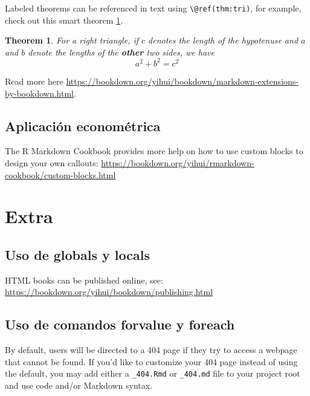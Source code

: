 \documentclass[
]{book}
\newtheorem{theorem}{Theorem}[chapter]
\theoremstyle{definition}
\theoremstyle{definition}
\theoremstyle{definition}
\theoremstyle{definition}
\theoremstyle{remark}
\begin{document}
Labeled theorems can be referenced in text using \texttt{\textbackslash{}@ref(thm:tri)}, for example, check out this smart theorem \ref{thm:tri}.

\begin{theorem}
\protect\hypertarget{thm:tri}{}\label{thm:tri}For a right triangle, if \(c\) denotes the \emph{length} of the hypotenuse
and \(a\) and \(b\) denote the lengths of the \textbf{other} two sides, we have
\[a^2 + b^2 = c^2\]
\end{theorem}

Read more here \url{https://bookdown.org/yihui/bookdown/markdown-extensions-by-bookdown.html}.

\hypertarget{aplicaciuxf3n-economuxe9trica}{%
\section{Aplicación econométrica}\label{aplicaciuxf3n-economuxe9trica}}

The R Markdown Cookbook provides more help on how to use custom blocks to design your own callouts: \url{https://bookdown.org/yihui/rmarkdown-cookbook/custom-blocks.html}

\hypertarget{extra}{%
\chapter{Extra}\label{extra}}

\hypertarget{uso-de-globals-y-locals}{%
\section{Uso de globals y locals}\label{uso-de-globals-y-locals}}

HTML books can be published online, see: \url{https://bookdown.org/yihui/bookdown/publishing.html}

\hypertarget{uso-de-comandos-forvalue-y-foreach}{%
\section{Uso de comandos forvalue y foreach}\label{uso-de-comandos-forvalue-y-foreach}}

By default, users will be directed to a 404 page if they try to access a webpage that cannot be found. If you'd like to customize your 404 page instead of using the default, you may add either a \texttt{\_404.Rmd} or \texttt{\_404.md} file to your project root and use code and/or Markdown syntax.
\end{document}
